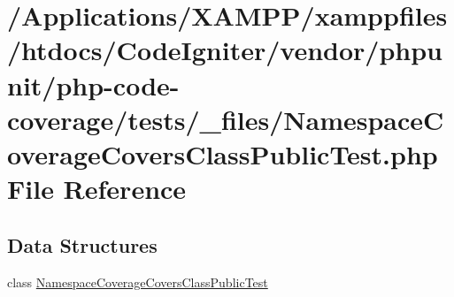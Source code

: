 \hypertarget{php-code-coverage_2tests_2__files_2_namespace_coverage_covers_class_public_test_8php}{}\section{/\+Applications/\+X\+A\+M\+P\+P/xamppfiles/htdocs/\+Code\+Igniter/vendor/phpunit/php-\/code-\/coverage/tests/\+\_\+files/\+Namespace\+Coverage\+Covers\+Class\+Public\+Test.php File Reference}
\label{php-code-coverage_2tests_2__files_2_namespace_coverage_covers_class_public_test_8php}
\subsection*{Data Structures}
\begin{DoxyCompactItemize}
\item 
class \mbox{\hyperlink{class_namespace_coverage_covers_class_public_test}{Namespace\+Coverage\+Covers\+Class\+Public\+Test}}
\end{DoxyCompactItemize}
